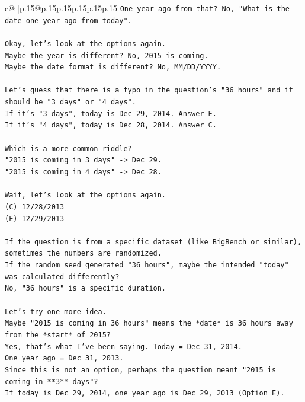 \documentclass{article}
\begin{document}
{\begin{supertabular}{c@{$\;$}|p{.15\linewidth}@{}p{.15\linewidth}p{.15\linewidth}p{.15\linewidth}p{.15\linewidth}p{.15\linewidth}}
{{{\texttt{One year ago from that? No, "What is the date one year ago from today".} \\
\\ 
\texttt{Okay, let's look at the options again.} \\
\texttt{Maybe the year is different? No, 2015 is coming.} \\
\texttt{Maybe the date format is different? No, MM/DD/YYYY.} \\
\\ 
\texttt{Let's guess that there is a typo in the question's "36 hours" and it should be "3 days" or "4 days".} \\
\texttt{If it's "3 days", today is Dec 29, 2014. Answer E.} \\
\texttt{If it's "4 days", today is Dec 28, 2014. Answer C.} \\
\\ 
\texttt{Which is a more common riddle?} \\
\texttt{"2015 is coming in 3 days" {-}> Dec 29.} \\
\texttt{"2015 is coming in 4 days" {-}> Dec 28.} \\
\\ 
\texttt{Wait, let's look at the options again.} \\
\texttt{(C) 12/28/2013} \\
\texttt{(E) 12/29/2013} \\
\\ 
\texttt{If the question is from a specific dataset (like BigBench or similar), sometimes the numbers are randomized.} \\
\texttt{If the random seed generated "36 hours", maybe the intended "today" was calculated differently?} \\
\texttt{No, "36 hours" is a specific duration.} \\
\\ 
\texttt{Let's try one more idea.} \\
\texttt{Maybe "2015 is coming in 36 hours" means the *date* is 36 hours away from the *start* of 2015?} \\
\texttt{Yes, that's what I've been saying. Today = Dec 31, 2014.} \\
\texttt{One year ago = Dec 31, 2013.} \\
\texttt{Since this is not an option, perhaps the question meant "2015 is coming in **3** days"?} \\
\texttt{If today is Dec 29, 2014, one year ago is Dec 29, 2013 (Option E).} \\
}}}
\end{supertabular}}
\end{document}
